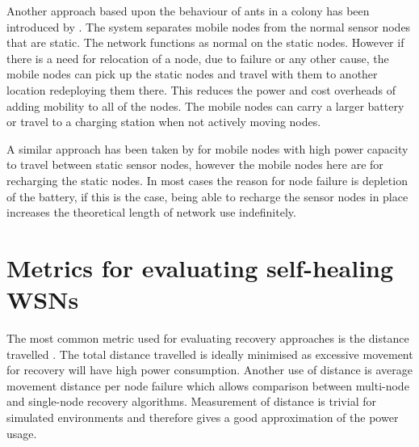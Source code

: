 \documentclass[authoryearcitations]{UoYCSproject}
\begin{document}
%

Another approach based upon the behaviour of ants in a colony has been introduced by \citet{Wang2014}. The system separates mobile nodes from the normal sensor nodes that are static. The network functions as normal on the static nodes. However if there is a need for relocation of a node, due to failure or any other cause, the mobile nodes can pick up the static nodes and travel with them to another location redeploying them there. This reduces the power and cost overheads of adding mobility to all of the nodes. The mobile nodes can carry a larger battery or travel to a charging station when not actively moving nodes.



A similar approach has been taken by \citet{Xu2015} for mobile nodes with high power capacity to travel between static sensor nodes, however the mobile nodes here are for recharging the static nodes. In most cases the reason for node failure is depletion of the battery, if this is the case, being able to recharge the sensor nodes in place increases the theoretical length of network use indefinitely.

\section{Metrics for evaluating self-healing WSNs}

The most common metric used for evaluating recovery approaches is the distance travelled \citep{Younis2014}. The total distance travelled is ideally minimised as excessive movement for recovery will have high power consumption. Another use of distance is average movement distance per node failure which allows comparison between multi-node and single-node recovery algorithms. Measurement of distance is trivial for simulated environments and therefore gives a good approximation of the power usage.
\end{document}
